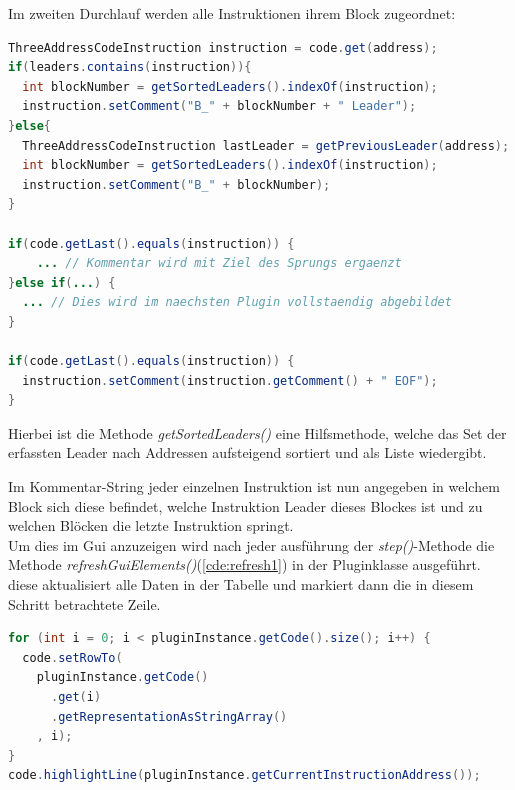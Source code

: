 Im zweiten Durchlauf werden alle Instruktionen ihrem Block zugeordnet:
\begin{lstlisting}[language=Java, caption={Zuordnen der Instruktionen zu ihren Blöcken}, label={cde:mapBlocks}]
ThreeAddressCodeInstruction instruction = code.get(address);
if(leaders.contains(instruction)){
  int blockNumber = getSortedLeaders().indexOf(instruction);
  instruction.setComment("B_" + blockNumber + " Leader");
}else{
  ThreeAddressCodeInstruction lastLeader = getPreviousLeader(address);
  int blockNumber = getSortedLeaders().indexOf(instruction);
  instruction.setComment("B_" + blockNumber);
}

if(code.getLast().equals(instruction)) {
    ... // Kommentar wird mit Ziel des Sprungs ergaenzt
}else if(...) {
  ... // Dies wird im naechsten Plugin vollstaendig abgebildet
}

if(code.getLast().equals(instruction)) {
  instruction.setComment(instruction.getComment() + " EOF");
}
\end{lstlisting}
Hierbei ist die Methode \textit{getSortedLeaders()} eine Hilfsmethode, welche
das Set der erfassten Leader nach Addressen aufsteigend sortiert und als Liste wiedergibt.

\newpage
Im Kommentar-String jeder einzelnen Instruktion ist nun angegeben in welchem
Block sich diese befindet, welche Instruktion Leader dieses Blockes ist und
zu welchen Blöcken die letzte Instruktion springt.\\
Um dies im Gui anzuzeigen wird nach jeder ausführung der \textit{step()}-Methode
die Methode \textit{refreshGuiElements()}(\cref{cde:refresh1}) in der Pluginklasse ausgeführt.
diese aktualisiert alle Daten in der Tabelle und markiert dann die in diesem
Schritt betrachtete Zeile.
\begin{lstlisting}[language=Java, caption={Aktualisieren der Tabelle}, label={cde:refresh1}]
for (int i = 0; i < pluginInstance.getCode().size(); i++) {
  code.setRowTo(
    pluginInstance.getCode()
      .get(i)
      .getRepresentationAsStringArray()
    , i);
}
code.highlightLine(pluginInstance.getCurrentInstructionAddress());
\end{lstlisting}





\newpage
